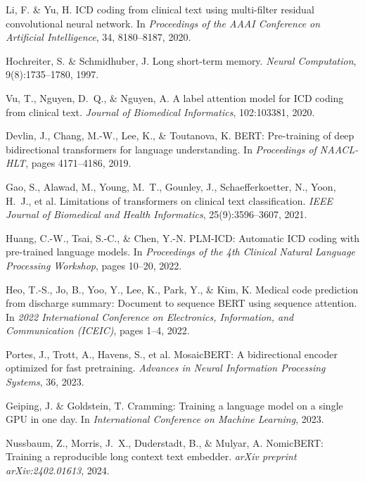 \documentclass[12pt,a4paper]{report}
\begin{document}
\begin{thebibliography}{99}
Li, F. \& Yu, H.
\newblock ICD coding from clinical text using multi-filter residual convolutional neural network.
\newblock In \emph{Proceedings of the AAAI Conference on Artificial Intelligence}, 34, 8180--8187, 2020.

Hochreiter, S. \& Schmidhuber, J.
\newblock Long short-term memory.
\newblock \emph{Neural Computation}, 9(8):1735--1780, 1997.

Vu, T., Nguyen, D.~Q., \& Nguyen, A.
\newblock A label attention model for ICD coding from clinical text.
\newblock \emph{Journal of Biomedical Informatics}, 102:103381, 2020.

Devlin, J., Chang, M.-W., Lee, K., \& Toutanova, K.
\newblock BERT: Pre-training of deep bidirectional transformers for language understanding.
\newblock In \emph{Proceedings of NAACL-HLT}, pages 4171--4186, 2019.

Gao, S., Alawad, M., Young, M.~T., Gounley, J., Schaefferkoetter, N., Yoon, H.~J., et al.
\newblock Limitations of transformers on clinical text classification.
\newblock \emph{IEEE Journal of Biomedical and Health Informatics}, 25(9):3596--3607, 2021.

Huang, C.-W., Tsai, S.-C., \& Chen, Y.-N.
\newblock PLM-ICD: Automatic ICD coding with pre-trained language models.
\newblock In \emph{Proceedings of the 4th Clinical Natural Language Processing Workshop}, pages 10--20, 2022.

Heo, T.-S., Jo, B., Yoo, Y., Lee, K., Park, Y., \& Kim, K.
\newblock Medical code prediction from discharge summary: Document to sequence BERT using sequence attention.
\newblock In \emph{2022 International Conference on Electronics, Information, and Communication (ICEIC)}, pages 1--4, 2022.

Portes, J., Trott, A., Havens, S., et al.
\newblock MosaicBERT: A bidirectional encoder optimized for fast pretraining.
\newblock \emph{Advances in Neural Information Processing Systems}, 36, 2023.

Geiping, J. \& Goldstein, T.
\newblock Cramming: Training a language model on a single GPU in one day.
\newblock In \emph{International Conference on Machine Learning}, 2023.

Nussbaum, Z., Morris, J.~X., Duderstadt, B., \& Mulyar, A.
\newblock NomicBERT: Training a reproducible long context text embedder.
\newblock \emph{arXiv preprint arXiv:2402.01613}, 2024.


\end{thebibliography}
\end{document}
